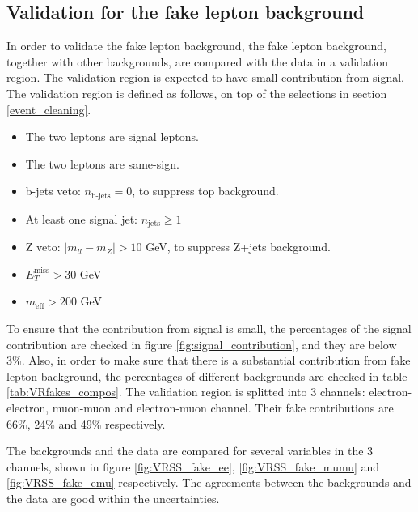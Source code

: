 \subsection{Validation for the fake lepton background}
In order to validate the fake lepton background, the fake lepton background, together with other backgrounds, are compared with the data in a validation region.
The validation region is expected to have small contribution from signal.
The validation region is defined as follows, on top of the selections in section \ref{event_cleaning}.
\begin{itemize}
\item The two leptons are signal leptons.
\item The two leptons are same-sign.
\item b-jets veto: $n_{\text{b-jets}} = 0$, to suppress top background.
\item At least one signal jet: $n_{\text{jets}} \geq 1$
\item Z veto: $|m_{ll} - m_Z| > 10$ GeV, to suppress Z+jets background.
\item $E_{T}^{\text{miss}} > 30$ GeV
\item $m_{\text{eff}} > 200$ GeV
\end{itemize}

To ensure that the contribution from signal is small, the percentages of the signal contribution are checked in figure \ref{fig:signal_contribution}, and they are below 3\%.
Also, in order to make sure that there is a substantial contribution from fake lepton background, the percentages of different backgrounds are checked in table \ref{tab:VRfakes_compos}.
The validation region is splitted into 3 channels: electron-electron, muon-muon and electron-muon channel.
Their fake contributions are 66\%,  24\% and 49\% respectively.

The backgrounds and the data are compared for several variables in the 3 channels, shown in figure \ref{fig:VRSS_fake_ee}, \ref{fig:VRSS_fake_mumu} and \ref{fig:VRSS_fake_emu} respectively.
The agreements between the backgrounds and the data are good within the uncertainties.

